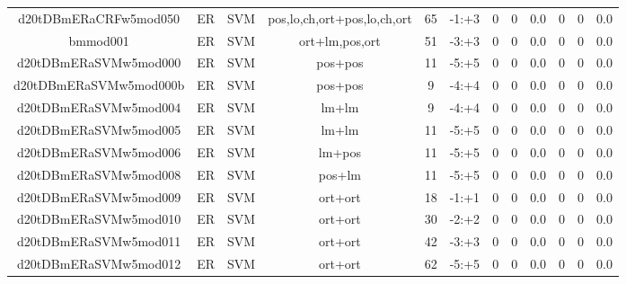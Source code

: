 \documentclass[a4paper]{article}
\begin{document}
\begin{landscape}
\begin{center}
\begin{tabular}{ |c|c|c|c|c|c|c|c|c|c|c|c|}
 
 	
 	\small{ d20tDBmERaCRFw5mod050 } & ER & SVM & pos,lo,ch,ort+pos,lo,ch,ort  &  65 &  -1:+3  &  0 & 0 & 0.0  &  0 & 0 & 0.0 \\
 	

 
 	
 	\small{ bmmod001 } & ER & SVM & ort+lm,pos,ort  &  51 &  -3:+3  &  0 & 0 & 0.0  &  0 & 0 & 0.0 \\
 	

 
 	
 	\small{ d20tDBmERaSVMw5mod000 } & ER & SVM & pos+pos  &  11 &  -5:+5  &  0 & 0 & 0.0  &  0 & 0 & 0.0 \\
 	

 
 	
 	\small{ d20tDBmERaSVMw5mod000b } & ER & SVM & pos+pos  &  9 &  -4:+4  &  0 & 0 & 0.0  &  0 & 0 & 0.0 \\
 	

 
 	
 	\small{ d20tDBmERaSVMw5mod004 } & ER & SVM & lm+lm  &  9 &  -4:+4  &  0 & 0 & 0.0  &  0 & 0 & 0.0 \\
 	

 
 	
 	\small{ d20tDBmERaSVMw5mod005 } & ER & SVM & lm+lm  &  11 &  -5:+5  &  0 & 0 & 0.0  &  0 & 0 & 0.0 \\
 	

 
 	
 	\small{ d20tDBmERaSVMw5mod006 } & ER & SVM & lm+pos  &  11 &  -5:+5  &  0 & 0 & 0.0  &  0 & 0 & 0.0 \\
 	

 
 	
 	\small{ d20tDBmERaSVMw5mod008 } & ER & SVM & pos+lm  &  11 &  -5:+5  &  0 & 0 & 0.0  &  0 & 0 & 0.0 \\
 	

 
 	
 	\small{ d20tDBmERaSVMw5mod009 } & ER & SVM & ort+ort  &  18 &  -1:+1  &  0 & 0 & 0.0  &  0 & 0 & 0.0 \\
 	

 
 	
 	\small{ d20tDBmERaSVMw5mod010 } & ER & SVM & ort+ort  &  30 &  -2:+2  &  0 & 0 & 0.0  &  0 & 0 & 0.0 \\
 	

 
 	
 	\small{ d20tDBmERaSVMw5mod011 } & ER & SVM & ort+ort  &  42 &  -3:+3  &  0 & 0 & 0.0  &  0 & 0 & 0.0 \\
 	

 
 	
 	\small{ d20tDBmERaSVMw5mod012 } & ER & SVM & ort+ort  &  62 &  -5:+5  &  0 & 0 & 0.0  &  0 & 0 & 0.0 \\
 	


\end{tabular}
\end{center}
\end{landscape}
\end{document}
